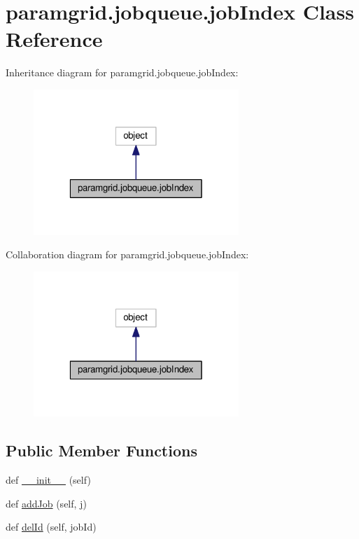 \hypertarget{classparamgrid_1_1jobqueue_1_1jobIndex}{}\section{paramgrid.\+jobqueue.\+job\+Index Class Reference}
\label{classparamgrid_1_1jobqueue_1_1jobIndex}


Inheritance diagram for paramgrid.\+jobqueue.\+job\+Index\+:
\nopagebreak
\begin{figure}[H]
\begin{center}
\leavevmode
\includegraphics[width=220pt]{classparamgrid_1_1jobqueue_1_1jobIndex__inherit__graph}
\end{center}
\end{figure}


Collaboration diagram for paramgrid.\+jobqueue.\+job\+Index\+:
\nopagebreak
\begin{figure}[H]
\begin{center}
\leavevmode
\includegraphics[width=220pt]{classparamgrid_1_1jobqueue_1_1jobIndex__coll__graph}
\end{center}
\end{figure}
\subsection*{Public Member Functions}
\begin{DoxyCompactItemize}
\item 
def \mbox{\hyperlink{classparamgrid_1_1jobqueue_1_1jobIndex_a9146b8ea827ff1fe945bfde30b11f3b6}{\+\_\+\+\_\+init\+\_\+\+\_\+}} (self)
\item 
def \mbox{\hyperlink{classparamgrid_1_1jobqueue_1_1jobIndex_a74a0c4dce1318108c3017334fdf399ee}{add\+Job}} (self, \mbox{\hyperlink{plotcls_8m_ac86694252f8dfdb19aaeadc4b7c342c6}{j}})
\item 
def \mbox{\hyperlink{classparamgrid_1_1jobqueue_1_1jobIndex_aee54c89b7dd7a7048f938c29c045beee}{del\+Id}} (self, job\+Id)
\end{DoxyCompactItemize}
